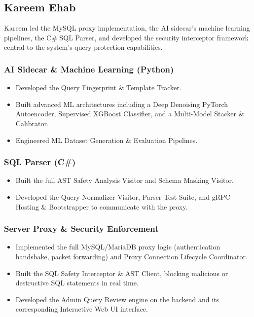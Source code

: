 
\subsection{Kareem Ehab}

Kareem led the MySQL proxy implementation, the AI sidecar's machine learning pipelines, the C\# SQL Parser, and developed the security interceptor framework central to the system’s query protection capabilities.

\subsubsection{AI Sidecar \& Machine Learning (Python)}
\begin{itemize}
    \item Developed the Query Fingerprint \& Template Tracker.
    \item Built advanced ML architectures including a Deep Denoising PyTorch Autoencoder, Supervised XGBoost Classifier, and a Multi-Model Stacker \& Calibrator.
    \item Engineered ML Dataset Generation \& Evaluation Pipelines.
\end{itemize}

\subsubsection{SQL Parser (C\#)}
\begin{itemize}
    \item Built the full AST Safety Analysis Visitor and Schema Masking Visitor.
    \item Developed the Query Normalizer Visitor, Parser Test Suite, and gRPC Hosting \& Bootstrapper to communicate with the proxy.
\end{itemize}

\subsubsection{Server Proxy \& Security Enforcement}
\begin{itemize}
    \item Implemented the full MySQL/MariaDB proxy logic (authentication handshake, packet forwarding) and Proxy Connection Lifecycle Coordinator.
    \item Built the SQL Safety Interceptor \& AST Client, blocking malicious or destructive SQL statements in real time.
    \item Developed the Admin Query Review engine on the backend and its corresponding Interactive Web UI interface.
\end{itemize}

